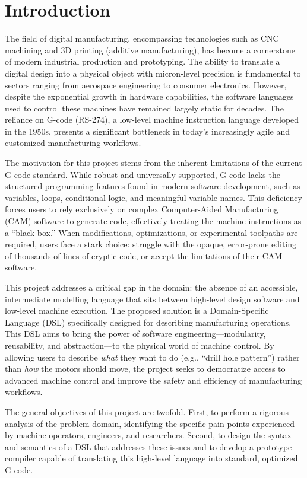 \chapter*{Introduction}

The field of digital manufacturing, encompassing technologies such as CNC machining and 3D printing (additive manufacturing), has become a cornerstone of modern industrial production and prototyping. The ability to translate a digital design into a physical object with micron-level precision is fundamental to sectors ranging from aerospace engineering to consumer electronics. However, despite the exponential growth in hardware capabilities, the software languages used to control these machines have remained largely static for decades. The reliance on G-code (RS-274), a low-level machine instruction language developed in the 1950s, presents a significant bottleneck in today's increasingly agile and customized manufacturing workflows.

The motivation for this project stems from the inherent limitations of the current G-code standard. While robust and universally supported, G-code lacks the structured programming features found in modern software development, such as variables, loops, conditional logic, and meaningful variable names. This deficiency forces users to rely exclusively on complex Computer-Aided Manufacturing (CAM) software to generate code, effectively treating the machine instructions as a ``black box.'' When modifications, optimizations, or experimental toolpaths are required, users face a stark choice: struggle with the opaque, error-prone editing of thousands of lines of cryptic code, or accept the limitations of their CAM software.

This project addresses a critical gap in the domain: the absence of an accessible, intermediate modelling language that sits between high-level design software and low-level machine execution. The proposed solution is a Domain-Specific Language (DSL) specifically designed for describing manufacturing operations. This DSL aims to bring the power of software engineering—modularity, reusability, and abstraction—to the physical world of machine control. By allowing users to describe \textit{what} they want to do (e.g., ``drill hole pattern'') rather than \textit{how} the motors should move, the project seeks to democratize access to advanced machine control and improve the safety and efficiency of manufacturing workflows.

The general objectives of this project are twofold. First, to perform a rigorous analysis of the problem domain, identifying the specific pain points experienced by machine operators, engineers, and researchers. Second, to design the syntax and semantics of a DSL that addresses these issues and to develop a prototype compiler capable of translating this high-level language into standard, optimized G-code.

